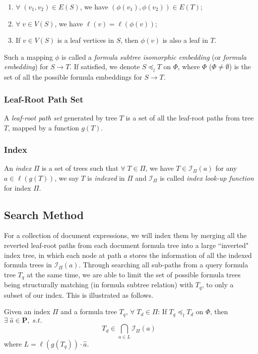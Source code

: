 \begin{enumerate}
\item 
$\forall\; (v_1,v_2) \in E(S)$, we have $(\phi(v_1),\phi(v_2)) \in E(T)$;
\item
$\forall\; v \in V(S)$, we have $\ell(v) = \ell(\phi(v))$;
\item
If $v \in V(S)$ is a leaf vertices in $S$, then $\phi(v)$ is also a leaf in $T$.
\end{enumerate}
Such a mapping $\phi$ is called a \textit{formula subtree isomorphic embedding} (or \textit{formula embedding}) for $S \rightarrow T$. 
If satisfied, we denote $S \preceq_l T$ on $\Phi$, where $\Phi$ ($\Phi \neq \emptyset$) is the set of all the possible formula embeddings for $S \rightarrow T$.

\subsubsection{Leaf-Root Path Set}
A \textit{leaf-root path set} generated by tree $T$ is a set of all the leaf-root paths from tree $T$, mapped by a function $g(T)$. 

\subsubsection{Index}
An \textit{index} $\Pi$ is a set of trees such that $\forall\; T \in \Pi$, we have $T \in \mathcal{I}_{\Pi}(a)$ for any $a \in \ell(g(T))$, we say $T$ is \textit{indexed} in $\Pi$ and $\mathcal{I}_{\Pi}$ is called \textit{index look-up function} for index $\Pi$. 

\subsection{Search Method}
\label{se-method}
For a collection of document expressions, we will index them by merging all the reverted leaf-root paths from each document formula tree into a large ``inverted" index tree, 
in which each node at path $a$ stores the information of all the indexed formula trees in $\mathcal{I}_{\Pi}(a)$.
Through searching all sub-paths from a query formula tree $T_q$ at the same time, we are able to limit the set of possible formula trees being structurally matching (in formula subtree relation) with $T_q$, to only a subset of our index. 
This is illustrated as follows.

Given an index $\Pi$ and a formula tree $T_q$, $\forall\; T_d \in \Pi$:
If $T_q \preceq_l T_d$ on $\Phi$, then $\exists\; \hat{a} \in \mathbf{P},\; s.t.$
$$
T_d \in \bigcap_{a \in L} \mathcal{I}_{\Pi}(a)
$$
where $L = \ell(g(T_q)) \cdot \hat{a}$.

